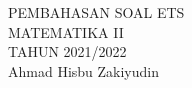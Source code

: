 \documentclass{article}
\begin{document}
 \begin{titlepage}
    \vspace*{\fill}
    \begin{center}
      \Huge {PEMBAHASAN SOAL ETS \\ MATEMATIKA II \\ TAHUN 2021/2022}\\[0.4 cm]
      \huge {Ahmad Hisbu Zakiyudin}
    \end{center}
    \vspace*{\fill}
  \end{titlepage}
\makeatletter
\renewcommand*\env@matrix[1][*\c@MaxMatrixCols c]{%
  \hskip -\arraycolsep
  \let\@ifnextchar\new@ifnextchar
  \array{#1}}
\makeatother
\newcount\arrowcount
\newcommand\arrows[1]{
        \global\arrowcount#1
        \ifnum\arrowcount>0
                \begin{matrix}[c]
                \expandafter\nextarrow
        \fi
}

\newcommand\nextarrow[1]{
        \global\advance\arrowcount-1
        \ifx\relax#1\relax\else \xrightarrow{#1}\fi
        \ifnum\arrowcount=0
                \end{matrix}
        \else
                \\
                \expandafter\nextarrow
        \fi
}
\newpage
{}
\end{document}
